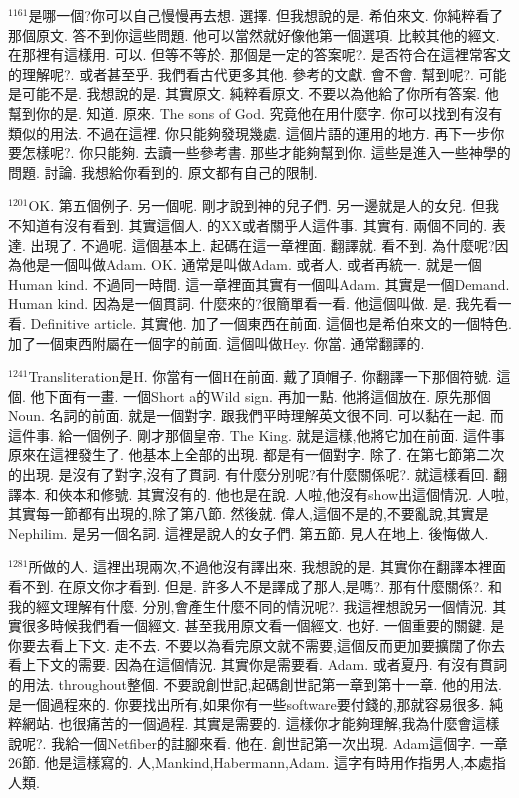 \documentclass{book}
\begin{document}
$^{1161}$是哪一個?你可以自己慢慢再去想.
選擇.
但我想說的是.
希伯來文.
你純粹看了那個原文.
答不到你這些問題.
他可以當然就好像他第一個選項.
比較其他的經文.
在那裡有這樣用.
可以.
但等不等於.
那個是一定的答案呢?.
是否符合在這裡常客文的理解呢?.
或者甚至乎.
我們看古代更多其他.
參考的文獻.
會不會.
幫到呢?.
可能是可能不是.
我想說的是.
其實原文.
純粹看原文.
不要以為他給了你所有答案.
他幫到你的是.
知道.
原來.
The sons of God.
究竟他在用什麼字.
你可以找到有沒有類似的用法.
不過在這裡.
你只能夠發現幾處.
這個片語的運用的地方.
再下一步你要怎樣呢?.
你只能夠.
去讀一些參考書.
那些才能夠幫到你.
這些是進入一些神學的問題.
討論.
我想給你看到的.
原文都有自己的限制.

$^{1201}$OK.
第五個例子.
另一個呢.
剛才說到神的兒子們.
另一邊就是人的女兒.
但我不知道有沒有看到.
其實這個人.
的XX或者關乎人這件事.
其實有.
兩個不同的.
表達.
出現了.
不過呢.
這個基本上.
起碼在這一章裡面.
翻譯就.
看不到.
為什麼呢?因為他是一個叫做Adam.
OK.
通常是叫做Adam.
或者人.
或者再統一.
就是一個Human kind.
不過同一時間.
這一章裡面其實有一個叫Adam.
其實是一個Demand.
Human kind.
因為是一個貫詞.
什麼來的?很簡單看一看.
他這個叫做.
是.
我先看一看.
Definitive article.
其實他.
加了一個東西在前面.
這個也是希伯來文的一個特色.
加了一個東西附屬在一個字的前面.
這個叫做Hey.
你當.
通常翻譯的.

$^{1241}$Transliteration是H.
你當有一個H在前面.
戴了頂帽子.
你翻譯一下那個符號.
這個.
他下面有一畫.
一個Short a的Wild sign.
再加一點.
他將這個放在.
原先那個Noun.
名詞的前面.
就是一個對字.
跟我們平時理解英文很不同.
可以黏在一起.
而這件事.
給一個例子.
剛才那個皇帝.
The King.
就是這樣,他將它加在前面.
這件事原來在這裡發生了.
他基本上全部的出現.
都是有一個對字.
除了.
在第七節第二次的出現.
是沒有了對字,沒有了貫詞.
有什麼分別呢?有什麼關係呢?.
就這樣看回.
翻譯本.
和俠本和修號.
其實沒有的.
他也是在說.
人啦,他沒有show出這個情況.
人啦,其實每一節都有出現的,除了第八節.
然後就.
偉人,這個不是的,不要亂說,其實是Nephilim.
是另一個名詞.
這裡是說人的女子們.
第五節.
見人在地上.
後悔做人.

$^{1281}$所做的人.
這裡出現兩次,不過他沒有譯出來.
我想說的是.
其實你在翻譯本裡面看不到.
在原文你才看到.
但是.
許多人不是譯成了那人,是嗎?.
那有什麼關係?.
和我的經文理解有什麼.
分別,會產生什麼不同的情況呢?.
我這裡想說另一個情況.
其實很多時候我們看一個經文.
甚至我用原文看一個經文.
也好.
一個重要的關鍵.
是你要去看上下文.
走不去.
不要以為看完原文就不需要,這個反而更加要擴闊了你去看上下文的需要.
因為在這個情況.
其實你是需要看.
Adam.
或者夏丹.
有沒有貫詞的用法.
throughout整個.
不要說創世記,起碼創世記第一章到第十一章.
他的用法.
是一個過程來的.
你要找出所有,如果你有一些software要付錢的,那就容易很多.
純粹網站.
也很痛苦的一個過程.
其實是需要的.
這樣你才能夠理解,我為什麼會這樣說呢?.
我給一個Netfiber的註腳來看.
他在.
創世記第一次出現.
Adam這個字.
一章26節.
他是這樣寫的.
人,Mankind,Habermann,Adam.
這字有時用作指男人,本處指人類.
\end{document}
